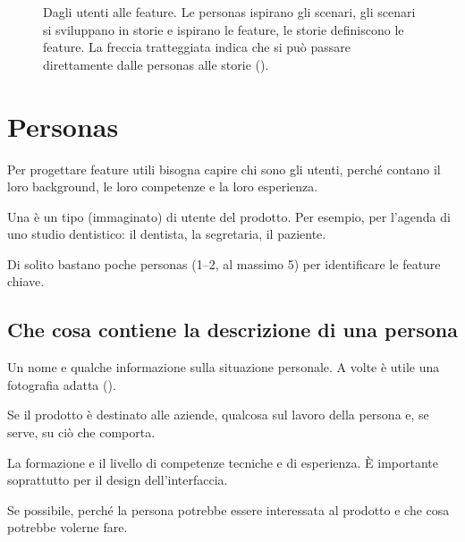 \begin{figure}[ht]
\centering
{}
\caption{Dagli utenti alle feature. Le personas ispirano gli scenari, gli scenari si sviluppano in storie e
ispirano le feature, le storie definiscono le feature. La freccia tratteggiata indica che si può passare
direttamente dalle personas alle storie ().}
\label{fig:feature-relazioni}
\end{figure}

\section{Personas}
\label{sec:feature-personas}

Per progettare feature utili bisogna capire chi sono gli utenti, perché contano il loro background, le loro competenze e la
loro esperienza.

\begin{definizione}[Persona]
Una  è un tipo (immaginato) di utente del prodotto. Per esempio, per l'agenda di uno studio
dentistico: il dentista, la segretaria, il paziente.
\end{definizione}

Di solito bastano poche personas (1--2, al massimo 5) per identificare le feature chiave.

\subsection{Che cosa contiene la descrizione di una persona}

\begin{description}[leftmargin=0pt, style=unboxed]
  \item[Personalization.] Un nome e qualche informazione sulla situazione personale. A volte è utile una fotografia
    adatta ().
  \item[Job-related.] Se il prodotto è destinato alle aziende, qualcosa sul lavoro della persona e, se serve, su ciò
    che comporta.
  \item[Education.] La formazione e il livello di competenze tecniche e di esperienza. È importante soprattutto per
    il design dell'interfaccia.
  \item[Relevance.] Se possibile, perché la persona potrebbe essere interessata al prodotto e che cosa potrebbe volerne
    fare.
\end{description}

